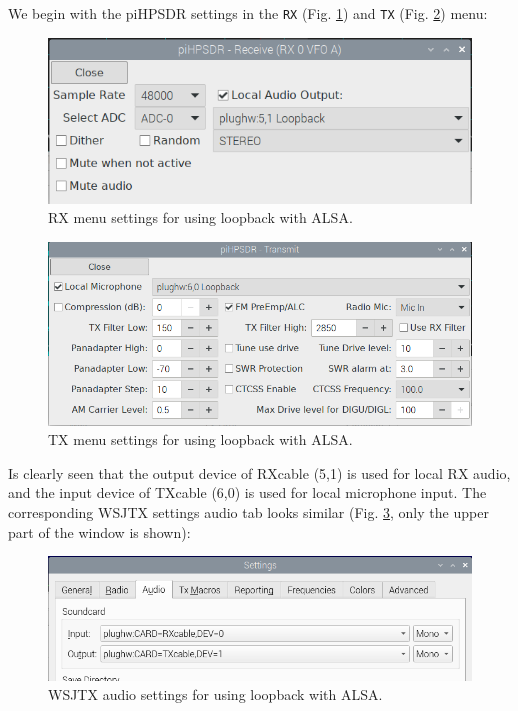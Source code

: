 \documentclass[12pt]{book}
\def\bltt#1{\texttt{\color{blue}#1}}
\def\pH{pi\-HPSDR\xspace}
\begin{document}
We begin with the \pH settings in the \bltt{RX} (Fig. \ref{fig:rx_settings_alsa_audio}) and
\bltt{TX} (Fig. \ref{fig:tx_settings_alsa_audio}) menu:

\begin{figure}[ht]
\center
\includegraphics[width=12cm]{rx_settings_alsa_audio.png}
\caption{RX menu settings for using loopback with ALSA.}
\label{fig:rx_settings_alsa_audio}
\end{figure}

\begin{figure}[ht]
\center
\includegraphics[width=12cm]{tx_settings_alsa_audio.png}
\caption{TX menu settings for using loopback with ALSA.}
\label{fig:tx_settings_alsa_audio}
\end{figure}

Is clearly seen that the output device of RXcable (5,1) is used for local RX audio, and the input
device of TXcable (6,0) is used for local microphone input. The corresponding WSJTX settings audio
tab looks similar (Fig. \ref{fig:wsjtx_settings_alsa_audio}, only the upper part of the
window is shown):

\begin{figure}[ht]
\center
\includegraphics[width=12cm]{wsjtx_settings_alsa_audio.png}
\caption{WSJTX audio settings for using loopback with ALSA.}
\label{fig:wsjtx_settings_alsa_audio}
\end{figure}
\end{document}

